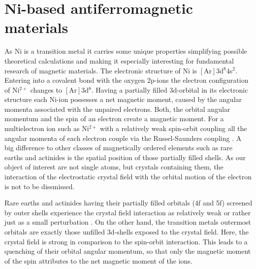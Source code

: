 \section{Ni-based antiferromagnetic materials}
As Ni is a transition metal it carries some unique properties simplifying possible theoretical calculations and making it especially interesting for fundamental research of magnetic materials.
The electronic structure of Ni is $[\text{Ar}]3$d$^8 4$s$^2$.
Entering into a covalent bond with the oxygen 2p-ions the electron configuration of Ni$^{2+}$ changes to $[\text{Ar}]3$d$^8$.
Having a partially filled 3d-orbital in its electronic structure each Ni-ion possesses a net magnetic moment, caused by the angular momenta associated with the unpaired electrons.
Both, the orbital angular momentum and the spin of an electron create a magnetic moment.
For a multielectron ion such as Ni$^{2+}$ with a relatively weak spin-orbit coupling all the angular momenta of each electron couple via the Russel-Saunders coupling \cite{ogale_functional_2013}.
A big difference to other classes of magnetically ordered elements such as rare earths and actinides is the spatial position of those partially filled shells.
As our object of interest are not single atoms, but crystals containing them, the interaction of the electrostatic crystal field with the orbital motion of the electron is not to be dissmissed.

Rare earths and actinides having their partially filled orbitals (4f and 5f) screened by outer shells experience the crystal field interaction as relatively weak or rather just as a small perturbation \cite{tanner_antiferromagnetic_1979}.
On the other hand, the transition metals outermost orbitals are exactly those unfilled 3d-shells exposed to the crystal field.
Here, the crystal field is strong in comparison to the spin-orbit interaction.
This leads to a quenching of their orbital angular momentum, so that only the magnetic moment of the spin attributes to the net magnetic moment of the ions.

